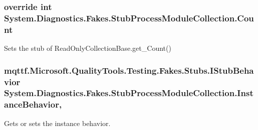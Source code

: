 \hypertarget{class_system_1_1_diagnostics_1_1_fakes_1_1_stub_process_module_collection_a282a41467e228e2c34d856164924f9fe}{
\subsubsection[{Count}]{\setlength{\rightskip}{0pt plus 5cm}override int System.\-Diagnostics.\-Fakes.\-Stub\-Process\-Module\-Collection.\-Count\hspace{0.3cm}{\ttfamily [get]}}}\label{class_system_1_1_diagnostics_1_1_fakes_1_1_stub_process_module_collection_a282a41467e228e2c34d856164924f9fe}


Sets the stub of Read\-Only\-Collection\-Base.\-get\-\_\-\-Count()

\hypertarget{class_system_1_1_diagnostics_1_1_fakes_1_1_stub_process_module_collection_a53f858f96baf2a0b7271885f2ec7478e}{
\subsubsection[{Instance\-Behavior}]{\setlength{\rightskip}{0pt plus 5cm}mqttf.\-Microsoft.\-Quality\-Tools.\-Testing.\-Fakes.\-Stubs.\-I\-Stub\-Behavior System.\-Diagnostics.\-Fakes.\-Stub\-Process\-Module\-Collection.\-Instance\-Behavior\hspace{0.3cm}{\ttfamily [get]}, {\ttfamily [set]}}}\label{class_system_1_1_diagnostics_1_1_fakes_1_1_stub_process_module_collection_a53f858f96baf2a0b7271885f2ec7478e}


Gets or sets the instance behavior.

